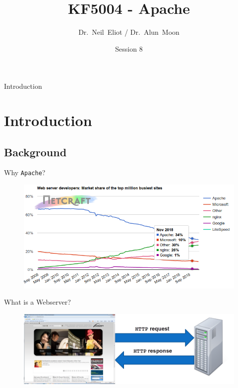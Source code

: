 \documentclass[xcolor=table]{beamer}
\title{KF5004 - Apache}
\author{Dr.~Neil~Eliot\inst{1} / Dr.~Alun~Moon\inst{1}}
\institute[Northumbria University] %
{
  \inst{1}
  Department of Computer and Information Sciences\\
  University of Northumbria
}
\date{Session 8}
\begin{document}
\begin{frame}
  \titlepage
\end{frame}

\begin{frame}{Introduction}
  \tableofcontents
\end{frame}


\section{Introduction}
\subsection{Background}
\begin{frame}{Why \texttt{Apache}?}
    \begin{figure}
      \begin{center}
        \includegraphics[width=1\linewidth]{Market.png}
      \end{center}
    \end{figure}
\end{frame}

\begin{frame}{What is a Webserver?}
  \begin{figure}
    \begin{center}
      \includegraphics[width=1\linewidth]{What.png}
    \end{center}
  \end{figure}
\end{frame}
\end{document}
